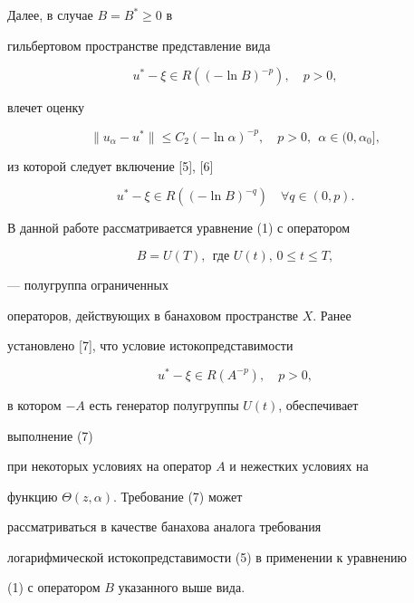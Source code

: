 Далее, в случае $B=B^*\geq 0$ в


гильбертовом пространстве представление вида


\begin{equation}


u^* - \xi \in R((-\ln B)^{-p}), \quad p>0,


\end{equation}


влечет оценку


\begin{equation}


\| u_\alpha - u^* \| \leq C_2(-\ln\alpha)^{-p}, \quad p>0,


\ \ \alpha\in (0, \alpha_0],


\end{equation}


из которой следует включение [5], [6]


$$


u^* - \xi \in R((-\ln B)^{-q}) \quad\forall q\in(0,p).


$$





В данной работе рассматривается уравнение (1) с оператором


$$


B=U(T),\ \ \text{где  $U(t)$, $0\leq t\leq T$},


$$


--- полугруппа ограниченных


операторов, действующих в банаховом пространстве $X$. Ранее


установлено [7], что условие истокопредставимости


\begin{equation}


u^* - \xi \in R(A^{-p}), \quad {p>0},


\end{equation}


в котором $-A$ есть генератор полугруппы $U(t)$, обеспечивает


выполнение (7)


при некоторых условиях на оператор $A$ и нежестких условиях на


функцию $\Theta(z,\alpha)$. Требование (7) может


рассматриваться в качестве банахова аналога требования


логарифмической истокопредставимости (5) в применении к уравнению


(1) с оператором $B$ указанного выше вида.





